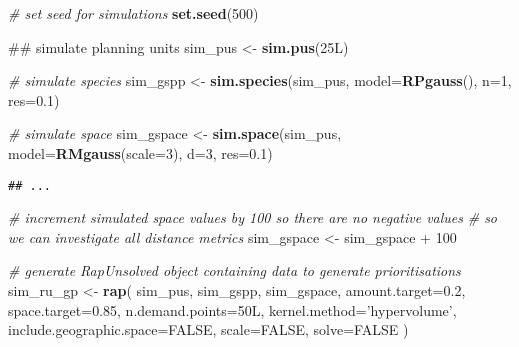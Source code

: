 \documentclass[11pt,]{article}
\newenvironment{Shaded}{\begin{snugshade}}{\end{snugshade}}
\newcommand{\KeywordTok}[1]{\textcolor[rgb]{0.13,0.29,0.53}{\textbf{{#1}}}}
\newcommand{\DataTypeTok}[1]{\textcolor[rgb]{0.13,0.29,0.53}{{#1}}}
\newcommand{\DecValTok}[1]{\textcolor[rgb]{0.00,0.00,0.81}{{#1}}}
\newcommand{\FloatTok}[1]{\textcolor[rgb]{0.00,0.00,0.81}{{#1}}}
\newcommand{\StringTok}[1]{\textcolor[rgb]{0.31,0.60,0.02}{{#1}}}
\newcommand{\CommentTok}[1]{\textcolor[rgb]{0.56,0.35,0.01}{\textit{{#1}}}}
\newcommand{\OtherTok}[1]{\textcolor[rgb]{0.56,0.35,0.01}{{#1}}}
\newcommand{\NormalTok}[1]{{#1}}
\begin{document}
\begin{Shaded}
\begin{Highlighting}[]
\CommentTok{# set seed for simulations}
\KeywordTok{set.seed}\NormalTok{(}\DecValTok{500}\NormalTok{)}

\NormalTok{## simulate planning units}
\NormalTok{sim_pus <-}\StringTok{ }\KeywordTok{sim.pus}\NormalTok{(25L)}

\CommentTok{# simulate species}
\NormalTok{sim_gspp <-}\StringTok{ }\KeywordTok{sim.species}\NormalTok{(sim_pus, }\DataTypeTok{model=}\KeywordTok{RPgauss}\NormalTok{(), }\DataTypeTok{n=}\DecValTok{1}\NormalTok{, }\DataTypeTok{res=}\FloatTok{0.1}\NormalTok{)}

\CommentTok{# simulate space}
\NormalTok{sim_gspace <-}\StringTok{ }\KeywordTok{sim.space}\NormalTok{(sim_pus, }\DataTypeTok{model=}\KeywordTok{RMgauss}\NormalTok{(}\DataTypeTok{scale=}\DecValTok{3}\NormalTok{), }\DataTypeTok{d=}\DecValTok{3}\NormalTok{, }\DataTypeTok{res=}\FloatTok{0.1}\NormalTok{)}
\end{Highlighting}
\end{Shaded}

\begin{verbatim}
## ...
\end{verbatim}

\begin{Shaded}
\begin{Highlighting}[]
\CommentTok{# increment simulated space values by 100 so there are no negative values}
\CommentTok{# so we can investigate all distance metrics}
\NormalTok{sim_gspace <-}\StringTok{ }\NormalTok{sim_gspace +}\StringTok{ }\DecValTok{100}
\end{Highlighting}
\end{Shaded}

\begin{Shaded}
\begin{Highlighting}[]
\CommentTok{# generate RapUnsolved object containing data to generate prioritisations}
\NormalTok{sim_ru_gp <-}\StringTok{ }\KeywordTok{rap}\NormalTok{(}
    \NormalTok{sim_pus, sim_gspp, sim_gspace, }
    \DataTypeTok{amount.target=}\FloatTok{0.2}\NormalTok{, }\DataTypeTok{space.target=}\FloatTok{0.85}\NormalTok{,}
    \DataTypeTok{n.demand.points=}\NormalTok{50L, }\DataTypeTok{kernel.method=}\StringTok{'hypervolume'}\NormalTok{,}
    \DataTypeTok{include.geographic.space=}\OtherTok{FALSE}\NormalTok{, }\DataTypeTok{scale=}\OtherTok{FALSE}\NormalTok{, }\DataTypeTok{solve=}\OtherTok{FALSE}
\NormalTok{)}
\end{Highlighting}
\end{Shaded}
\end{document}
